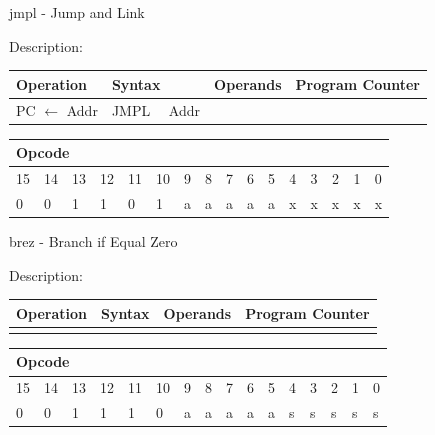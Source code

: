\documentclass[%
	pdftex,
	a4paper,
	oneside,
	bibtotoc,%
	idxtotoc,%
	bibtotocnumbered,
	halfparskip,%
]{scrbook}
\begin{document}
\bigskip

jmpl - Jump and Link

Description:

\begin{tabular}{|l|l|l|l|}
\hline
Operation & Syntax & Operands & Program Counter \\ \hline
PC $\longleftarrow $ Addr & JMPL \ \ Addr &  &  \\ \hline
\end{tabular}

\begin{tabular}{|c|c|c|c|c|c|c|c|c|c|c|c|c|c|c|c|}
\hline
\multicolumn{6}{|l|}{Opcode} & \multicolumn{5}{|l|}{} & \multicolumn{5}{|l|}{
} \\ \hline
15 & 14 & 13 & 12 & 11 & 10 & 9 & 8 & 7 & 6 & 5 & 4 & 3 & 2 & 1 & 0 \\ \hline
\multicolumn{1}{|l|}{0} & \multicolumn{1}{|l|}{0} & \multicolumn{1}{|l|}{1}
& \multicolumn{1}{|l|}{1} & \multicolumn{1}{|l|}{0} & \multicolumn{1}{|l|}{1}
& \multicolumn{1}{|l|}{a} & \multicolumn{1}{|l|}{a} & \multicolumn{1}{|l|}{a}
& \multicolumn{1}{|l|}{a} & \multicolumn{1}{|l|}{a} & \multicolumn{1}{|l|}{x}
& \multicolumn{1}{|l|}{x} & \multicolumn{1}{|l|}{x} & \multicolumn{1}{|l|}{x}
& \multicolumn{1}{|l|}{x} \\ \hline
\end{tabular}

\bigskip

brez - Branch if Equal Zero

Description:

\begin{tabular}{|l|l|l|l|}
\hline
Operation & Syntax & Operands & Program Counter \\ \hline
&  &  &  \\ \hline
\end{tabular}

\begin{tabular}{|c|c|c|c|c|c|c|c|c|c|c|c|c|c|c|c|}
\hline
\multicolumn{6}{|l|}{Opcode} & \multicolumn{5}{|l|}{} & \multicolumn{5}{|l|}{
} \\ \hline
15 & 14 & 13 & 12 & 11 & 10 & 9 & 8 & 7 & 6 & 5 & 4 & 3 & 2 & 1 & 0 \\ \hline
\multicolumn{1}{|l|}{0} & \multicolumn{1}{|l|}{0} & \multicolumn{1}{|l|}{1}
& \multicolumn{1}{|l|}{1} & \multicolumn{1}{|l|}{1} & \multicolumn{1}{|l|}{0}
& \multicolumn{1}{|l|}{a} & \multicolumn{1}{|l|}{a} & \multicolumn{1}{|l|}{a}
& \multicolumn{1}{|l|}{a} & \multicolumn{1}{|l|}{a} & \multicolumn{1}{|l|}{s}
& \multicolumn{1}{|l|}{s} & \multicolumn{1}{|l|}{s} & \multicolumn{1}{|l|}{s}
& \multicolumn{1}{|l|}{s} \\ \hline
\end{tabular}
\end{document}
